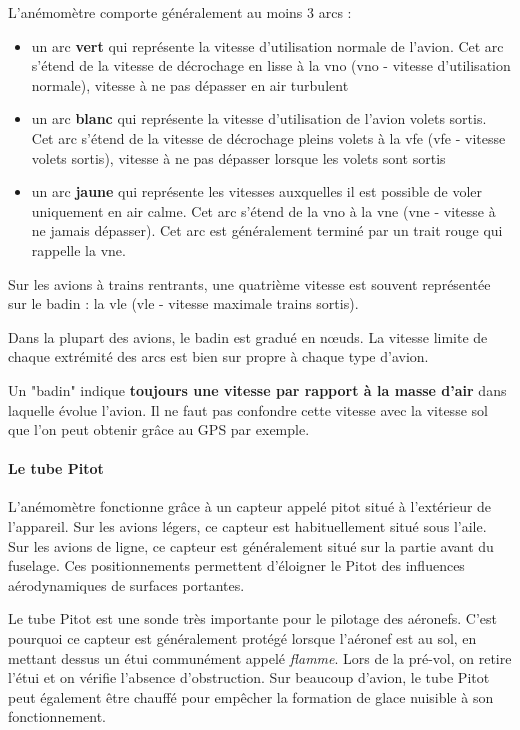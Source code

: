 	L'anémomètre comporte généralement au moins 3 arcs :
	\begin{itemize}
		\item un arc \textbf{vert} qui représente la vitesse d'utilisation normale de l'avion. Cet arc s'étend de la vitesse de décrochage en lisse à la \acrshort{vno} (\acrlong{vno} - vitesse d'utilisation normale), vitesse à ne pas dépasser en air turbulent
		\item un arc \textbf{blanc} qui représente la vitesse d'utilisation de l'avion volets sortis. Cet arc s'étend de la vitesse de décrochage pleins volets à la \acrshort{vfe} (\acrlong{vfe} - vitesse volets sortis), vitesse à ne pas dépasser lorsque les volets sont sortis
		\item un arc \textbf{jaune} qui représente les vitesses auxquelles il est possible de voler uniquement en air calme. Cet arc s'étend de la \acrshort{vno} à la \acrshort{vne} (\acrlong{vne} - vitesse à ne jamais dépasser). Cet arc est généralement terminé par un trait rouge qui rappelle la \acrshort{vne}.
	\end{itemize}
	
	Sur les avions à trains rentrants, une quatrième vitesse est souvent représentée sur le badin : la \acrshort{vle} (\acrlong{vle} - vitesse maximale trains sortis).
	
	Dans la plupart des avions, le badin est gradué en nœuds. La vitesse limite de chaque extrémité des arcs est bien sur propre à chaque type d'avion.
	
	\alert{Un "badin" indique \textbf{toujours une vitesse par rapport à la masse d'air} dans laquelle évolue l'avion. Il ne faut pas confondre cette vitesse avec la vitesse sol que l'on peut obtenir grâce au GPS par exemple.}
	
	\paragraph{Le tube Pitot}
	
	L'anémomètre fonctionne grâce à un capteur appelé \gls{pitot} situé à l'extérieur de l'appareil. Sur les avions légers, ce capteur est habituellement situé sous l'aile. Sur les avions de ligne, ce capteur est généralement situé sur la partie avant du fuselage. Ces positionnements permettent d'éloigner le Pitot des influences aérodynamiques de surfaces portantes.
	
	Le tube Pitot est une sonde très importante pour le pilotage des aéronefs. C'est pourquoi ce capteur est généralement protégé lorsque l'aéronef est au sol, en mettant dessus un étui communément appelé \textit{flamme}. Lors de la pré-vol, on retire l'étui et on vérifie l'absence d'obstruction. Sur beaucoup d'avion, le tube Pitot peut également être chauffé pour empêcher la formation de glace nuisible à son fonctionnement.
	
